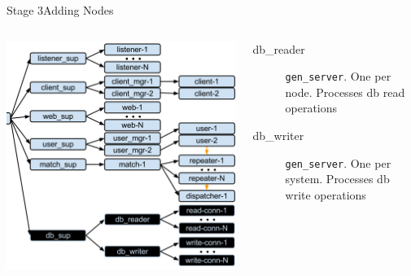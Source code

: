 \documentclass[utf8,hyperref={colorlinks=true}]{beamer}
\begin{document}
\begin{frame}{Stage 3}{Adding Nodes}
	\begin{columns}
			\begin{center}
				\includegraphics[height=.65\textheight]{img/architecture-4.png}
			\end{center}
			\begin{description}
				\item[db\_reader]
					\texttt{gen\_server}. One per node. Processes db read operations
				\item[db\_writer]
					\texttt{gen\_server}. One per \alert{system}. Processes db write operations
			\end{description}
	\end{columns}
\end{frame}
\end{document}
